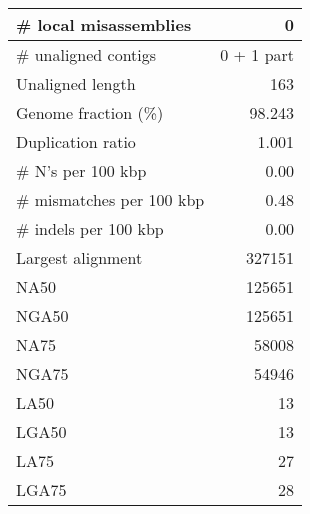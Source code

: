 \documentclass[12pt,a4paper]{article}
\begin{document}
\begin{table}[ht]
\begin{center}
\begin{tabular}{|l*{1}{|r}|}
\# local misassemblies & 0 \\ \hline
\# unaligned contigs & 0 + 1 part \\ \hline
Unaligned length & 163 \\ \hline
Genome fraction (\%) & 98.243 \\ \hline
Duplication ratio & 1.001 \\ \hline
\# N's per 100 kbp & 0.00 \\ \hline
\# mismatches per 100 kbp & 0.48 \\ \hline
\# indels per 100 kbp & 0.00 \\ \hline
Largest alignment & 327151 \\ \hline
NA50 & 125651 \\ \hline
NGA50 & 125651 \\ \hline
NA75 & 58008 \\ \hline
NGA75 & 54946 \\ \hline
LA50 & 13 \\ \hline
LGA50 & 13 \\ \hline
LA75 & 27 \\ \hline
LGA75 & 28 \\ \hline
\end{tabular}
\end{center}
\end{table}
\end{document}
